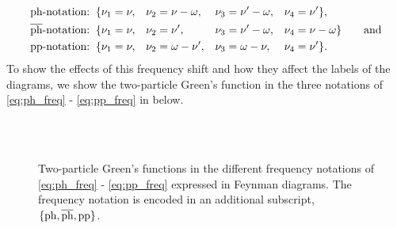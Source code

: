 \documentclass[../../main.tex]{subfiles}
\begin{document}
\begin{subequations}
\begin{align}
	\text{ph-notation:}&\;\;\{\nu_1=\nu,&&\nu_2=\nu-\omega,&&\nu_3=\nu'-\omega,&&\nu_4=\nu'\},\label{eq:ph_freq}\\
	\overline{\text{ph}}\text{-notation:}&\;\;\{\nu_1=\nu,&&\nu_2=\nu',&&\nu_3=\nu'-\omega,&&\nu_4=\nu-\omega\}\qquad\text{and}\label{eq:ph_bar_freq}\\
	\text{pp-notation:}&\;\;\{\nu_1=\nu,&&\nu_2=\omega-\nu',&&\nu_3=\omega-\nu,&&\nu_4=\nu'\}.\label{eq:pp_freq}
\end{align}
\end{subequations}
To show the effects of this frequency shift and how they affect the labels of the diagrams, we show the two-particle Green's function in the three notations of \eqref{eq:ph_freq} - \eqref{eq:pp_freq} in  below.
\begin{figure}[h]
  \centering
  \vspace{0.5cm}\\
  \vspace{0.5cm}\\
  \caption{Two-particle Green's functions in the different frequency notations of \eqref{eq:ph_freq} - \eqref{eq:pp_freq} expressed in Feynman diagrams. The frequency notation is encoded in an additional subscript, $\{\text{ph}, \overline{\text{ph}},\text{pp}\}$.}
  \label{fig:two_particle_green_channels}
\end{figure}
\end{document}
